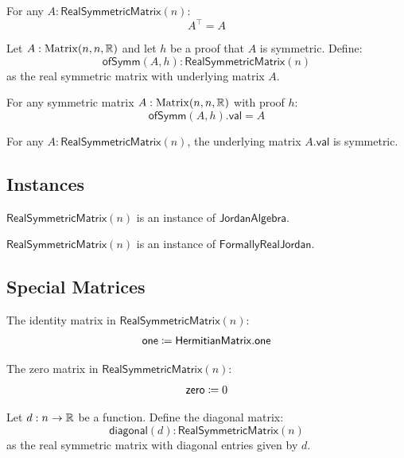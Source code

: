 \begin{theorem}[transpose\_eq]
For any $A : \mathsf{RealSymmetricMatrix}(n)$:
\[ A^\top = A \]
\end{theorem}

\begin{definition}[ofSymm]
Let $A : \mathrm{Matrix}(n, n, \mathbb{R})$ and let $h$ be a proof that $A$ is symmetric. Define:
\[ \mathsf{ofSymm}(A, h) : \mathsf{RealSymmetricMatrix}(n) \]
as the real symmetric matrix with underlying matrix $A$.
\end{definition}

\begin{lemma}
For any symmetric matrix $A : \mathrm{Matrix}(n, n, \mathbb{R})$ with proof $h$:
\[ \mathsf{ofSymm}(A, h).\mathsf{val} = A \]
\end{lemma}

\begin{theorem}[isSymm]
For any $A : \mathsf{RealSymmetricMatrix}(n)$, the underlying matrix $A.\mathsf{val}$ is symmetric.
\end{theorem}

\subsection{Instances}

\begin{proposition}
$\mathsf{RealSymmetricMatrix}(n)$ is an instance of $\mathsf{JordanAlgebra}$.
\end{proposition}

\begin{proposition}
$\mathsf{RealSymmetricMatrix}(n)$ is an instance of $\mathsf{FormallyRealJordan}$.
\end{proposition}

\subsection{Special Matrices}

\begin{definition}[one]
The identity matrix in $\mathsf{RealSymmetricMatrix}(n)$:
\[ \mathsf{one} \coloneqq \mathsf{HermitianMatrix.one} \]
\end{definition}

\begin{definition}[zero]
The zero matrix in $\mathsf{RealSymmetricMatrix}(n)$:
\[ \mathsf{zero} \coloneqq 0 \]
\end{definition}

\begin{definition}[diagonal]
Let $d : n \to \mathbb{R}$ be a function. Define the diagonal matrix:
\[ \mathsf{diagonal}(d) : \mathsf{RealSymmetricMatrix}(n) \]
as the real symmetric matrix with diagonal entries given by $d$.
\end{definition}


